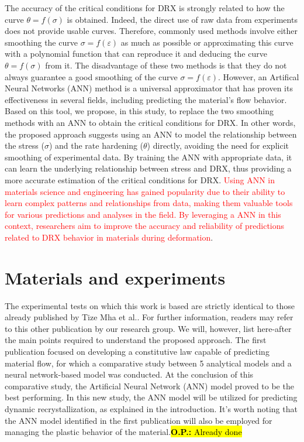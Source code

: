 \documentclass[metals,article,submit,pdftex,moreauthors]{Definitions/mdpi}
\makeatletter
\DeclareRobustCommand{\eal}{et al.\@\xspace}
\DeclareRobustCommand{\OP}[1]{\begingroup\sethlcolor{VWyellow}\textcolor{red}{\hl{\textbf{O.P.:} #1}}\endgroup}
\makeatother
\begin{document}
The accuracy of the critical conditions for DRX is strongly related to how the curve $\theta=f(\sigma)$ is obtained. Indeed, the direct use of raw data from experiments does not provide usable curves. Therefore, commonly used methods involve either smoothing the curve $\sigma=f(\varepsilon)$  as much as possible or approximating this curve with a polynomial function that can reproduce it and deducing the curve $\theta=f(\sigma)$ from it. The disadvantage of these two methods is that they do not always guarantee a good smoothing of the curve $\sigma=f(\varepsilon)$. However, an Artifical Neural Networks (ANN) method is a universal approximator that has proven its effectiveness in several fields, including predicting the material's flow behavior. Based on this tool, we propose, in this study, to replace the two smoothing methods with an ANN to obtain the critical conditions for DRX. In other words, the proposed approach suggests using an ANN to model the relationship between the stress ($\sigma$) and the rate hardening ($\theta$) directly, avoiding the need for explicit smoothing of experimental data. By training the ANN with appropriate data, it can learn the underlying relationship between stress and DRX, thus providing a more accurate estimation of the critical conditions for DRX. \textcolor{red}{Using ANN in materials science and engineering has gained popularity due to their ability to learn complex patterns and relationships from data, making them valuable tools for various predictions and analyses in the field. By leveraging a ANN in this context, researchers aim to improve the accuracy and reliability of predictions related to DRX behavior in materials during deformation}.

\section{Materials and experiments\label{sec:MaterialsExperiments}}
The experimental tests on which this work is based are strictly identical to those already published by Tize Mha \eal \cite{TizeMha-2023}.
For further information, readers may refer to this other publication by our research group. We will, however, list here-after the main points required to understand the proposed approach. The first publication focused on developing a constitutive law capable of predicting material flow, for which a comparative study between 5 analytical models and a neural network-based model was conducted. At the conclusion of this comparative study, the Artificial Neural Network (ANN) model proved to be the best performing. In this new study, the ANN model will be utilized for predicting dynamic recrystallization, as explained in the introduction. It's worth noting that the ANN model identified in the first publication will also be employed for managing the plastic behavior of the material.\OP{Already done}
\end{document}
